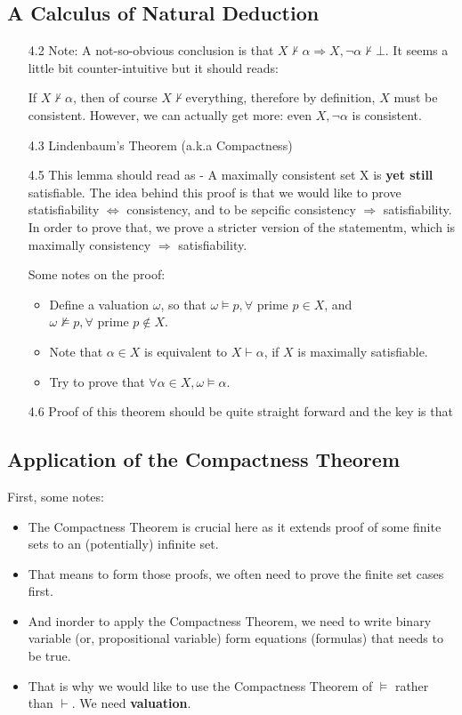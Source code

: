 \documentclass[a4paper, 12pt]{article}
\begin{document}
\subsection{A Calculus of Natural Deduction}
\begin{enumerate}
\item[4.2] Note: A not-so-obvious conclusion is that $X \not \vdash
  \alpha \Rightarrow X, \neg \alpha \not \vdash \bot$. It seems a
  little bit counter-intuitive but it should reads:


  If $X \not \vdash \alpha$, then of course $X \not \vdash \text{
    everything}$, therefore by definition, $X$ must be
  consistent. However, we can actually get more: even $X, \neg \alpha$
  is consistent.

  
\item[4.3] Lindenbaum's Theorem (a.k.a Compactness)
\item[4.5] This lemma should read as - A maximally consistent set X is
  \textbf{yet still} satisfiable. The idea behind this proof is that
  we would like to prove statisfiability $\Leftrightarrow$
  consistency, and to be sepcific consistency $\Rightarrow$
  satisfiability. In order to prove that, we prove a stricter version
  of the statementm, which is maximally consistency $\Rightarrow$
  satisfiability.

  Some notes on the proof:
  \begin{itemize}
  \item Define a valuation $\omega$, so that $\omega \models p,
    \forall \text{ prime } p \in X$, and $\omega \not \models p,
    \forall \text{ prime } p \not \in X$.
  \item Note that $\alpha \in X$ is equivalent to $X \vdash \alpha$,
    if $X$ is maximally satisfiable.
  \item Try to prove that $\forall \alpha \in X, \omega \models \alpha$.
  \end{itemize}

\item[4.6] Proof of this theorem should be quite straight forward and
  the key is that 

  
\end{enumerate}

\subsection{Application of the Compactness Theorem}

First, some notes:
\begin{itemize}
\item The Compactness Theorem is crucial here as it extends proof of
  some finite sets to an (potentially) infinite set.
\item That means to form those proofs, we often need to prove the
  finite set cases first.
\item And inorder to apply the Compactness Theorem, we need to write
  binary variable (or, propositional variable) form equations
  (formulas) that needs to be true.
\item That is why we would like to use the Compactness Theorem of
  $\models$ rather than $\vdash$. We need \textbf{valuation}.
\end{itemize}
\end{document}
